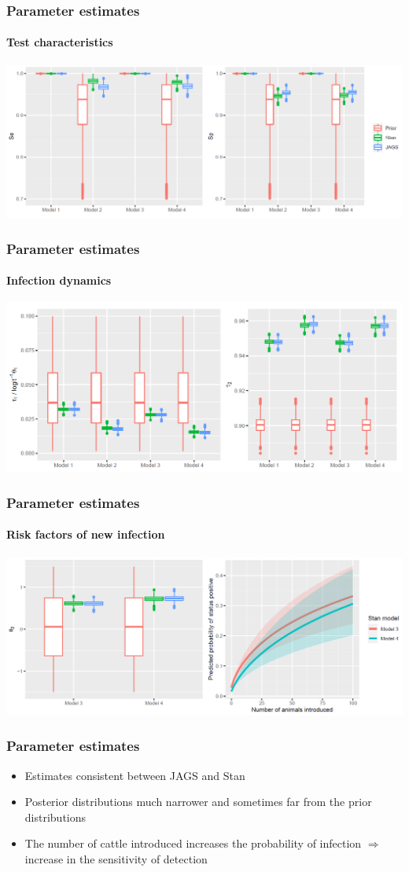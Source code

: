 \documentclass{beamer}
\begin{document}
\begin{frame}
\frametitle{Parameter estimates}
\framesubtitle{Test characteristics}
\includegraphics[width=\textwidth]{imgs/model_densities_1.png}
\end{frame}

\begin{frame}
\frametitle{Parameter estimates}
\framesubtitle{Infection dynamics}
\includegraphics[width=\textwidth]{imgs/model_densities_2.png}
\end{frame}

\begin{frame}
\frametitle{Parameter estimates}
\framesubtitle{Risk factors of new infection}
\includegraphics[width=\textwidth]{imgs/model_densities_3.png}
\end{frame}

\begin{frame}
\frametitle{Parameter estimates}
\begin{itemize}
\item{Estimates consistent between JAGS and Stan}
\item{Posterior distributions much narrower and sometimes far from the prior distributions}
\item{The number of cattle introduced increases the probability of infection $\Rightarrow$ increase in the sensitivity of detection}
\end{itemize}
\end{frame}
\end{document}
